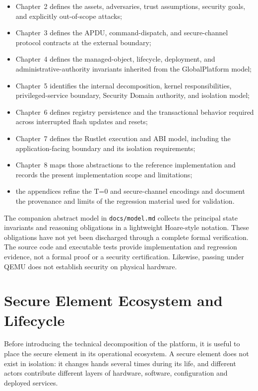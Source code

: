 \begin{itemize}
\item Chapter~2 defines the assets, adversaries, trust assumptions, security
  goals, and explicitly out-of-scope attacks;
\item Chapter~3 defines the APDU, command-dispatch, and secure-channel protocol
  contracts at the external boundary;
\item Chapter~4 defines the managed-object, lifecycle, deployment, and
  administrative-authority invariants inherited from the GlobalPlatform model;
\item Chapter~5 identifies the internal decomposition, kernel responsibilities,
  privileged-service boundary, Security Domain authority, and isolation model;
\item Chapter~6 defines registry persistence and the transactional behavior
  required across interrupted flash updates and resets;
\item Chapter~7 defines the Rustlet execution and ABI model, including the
  application-facing boundary and its isolation requirements;
\item Chapter~8 maps those abstractions to the reference implementation and
  records the present implementation scope and limitations;
\item the appendices refine the T=0 and secure-channel encodings and document
  the provenance and limits of the regression material used for validation.
\end{itemize}

The companion abstract model in \texttt{docs/model.md} collects the principal
state invariants and reasoning obligations in a lightweight Hoare-style
notation. These obligations have not yet been discharged through a complete
formal verification. The source code and executable tests provide implementation
and regression evidence, not a formal proof or a security certification.
Likewise, passing under QEMU does not establish security on physical hardware.

\section{Secure Element Ecosystem and Lifecycle}

Before introducing the technical decomposition of the platform, it is useful to
place the secure element in its operational ecosystem. A secure element does
not exist in isolation: it changes hands several times during its life, and
different actors contribute different layers of hardware, software,
configuration and deployed services.

